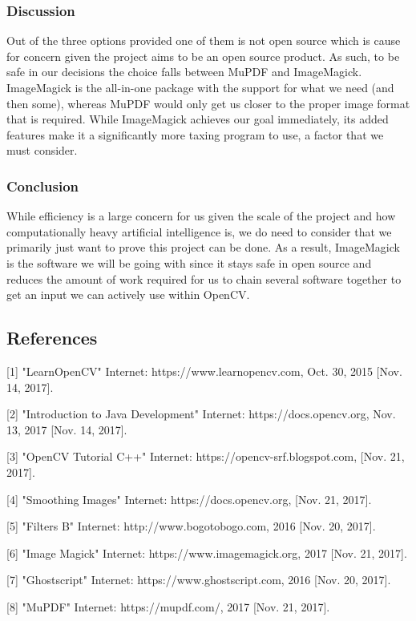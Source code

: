 \documentclass[article, onecolumn, draftclsnofoot,10pt, compsoc]{IEEEtran}
\begin{document}
\subsubsection{Discussion}
Out of the three options provided one of them is not open source which is cause for concern given the project aims to be an open source product. As such, to be safe in our decisions the choice falls between MuPDF and ImageMagick. ImageMagick is the all-in-one package with the support for what we need (and then some), whereas MuPDF would only get us closer to the proper image format that is required. While ImageMagick achieves our goal immediately, its added features make it a significantly more taxing program to use, a factor that we must consider.

\subsubsection{Conclusion}
While efficiency is a large concern for us given the scale of the project and how computationally heavy artificial intelligence is, we do need to consider that we primarily just want to prove this project can be done. As a result, ImageMagick is the software we will be going with since it stays safe in open source and reduces the amount of work required for us to chain several software together to get an input we can actively use within OpenCV.

\subsection{References}
[1] "LearnOpenCV" Internet: https://www.learnopencv.com, Oct. 30, 2015 [Nov. 14, 2017].

[2] "Introduction to Java Development" Internet: https://docs.opencv.org, Nov. 13, 2017 [Nov. 14, 2017].

[3] "OpenCV Tutorial C++" Internet: https://opencv-srf.blogspot.com, [Nov. 21, 2017].

[4] "Smoothing Images" Internet: https://docs.opencv.org, [Nov. 21, 2017].

[5] "Filters B" Internet: http://www.bogotobogo.com, 2016 [Nov. 20, 2017].

[6] "Image Magick" Internet: https://www.imagemagick.org, 2017 [Nov. 21, 2017].

[7] "Ghostscript" Internet: https://www.ghostscript.com, 2016 [Nov. 20, 2017]. 

[8] "MuPDF" Internet: https://mupdf.com/, 2017 [Nov. 21, 2017]. 
\end{document}

